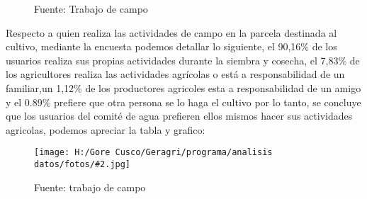 \documentclass{article}\usepackage[]{graphicx}\usepackage[table]{xcolor}
\makeatletter
\newenvironment{kframe}{%
 \def\at@end@of@kframe{}%
 \ifinner\ifhmode%
  \def\at@end@of@kframe{\end{minipage}}%
  \begin{minipage}{\columnwidth}%
 \fi\fi%
 \def\FrameCommand##1{\hskip\@totalleftmargin \hskip-\fboxsep
 \colorbox{shadecolor}{##1}\hskip-\fboxsep
     \hskip-\linewidth \hskip-\@totalleftmargin \hskip\columnwidth}%
 \MakeFramed {\advance\hsize-\width
   \@totalleftmargin\z@ \linewidth\hsize
   \@setminipage}}%
 {\par\unskip\endMakeFramed%
 \at@end@of@kframe}
\newenvironment{knitrout}{}{} %
\newenvironment{fotos}[2]
{\begin{figure}[H]
	\centering
	\caption{#1}
	\texttt{[image: H:/Gore Cusco/Geragri/programa/analisis datos/fotos/\#2.jpg]}
	\caption*{Fuente: trabajo de campo}}
{\end{figure}}
\makeatother
\begin{document}
\begin{figure}[H]
  \centering
  \caption{Persona que trabaja en la parcela}
\begin{knitrout}
\color{fgcolor}\begin{kframe}


{\ttfamily\noindent\bfseries{}}

{\ttfamily\noindent{}}

{\ttfamily\noindent\bfseries{}}

{\ttfamily\noindent\bfseries\color{errorcolor}{\#\# Error: objeto 'datos' no encontrado}}

{\ttfamily\noindent\bfseries\color{errorcolor}{\#\# Error: objeto 'datos' no encontrado}}

{\ttfamily\noindent\bfseries\color{errorcolor}{\#\# Error: objeto 'datos' no encontrado}}

{\ttfamily\noindent\bfseries\color{errorcolor}{\#\# Error: objeto 'graph1' no encontrado}}\end{kframe}
\end{knitrout}
  \caption*{Fuente: Trabajo de campo}
\end{figure}
Respecto a quien realiza las actividades de campo en la parcela destinada al cultivo, mediante la encuesta podemos detallar lo siguiente, el 90,16\% de los usuarios realiza sus propias actividades durante la siembra y cosecha, el 7,83\% de los agricultores realiza las actividades agrícolas o está a responsabilidad de un familiar,un 1,12\% de los productores agricoles esta a responsabilidad de un amigo y el 0.89\% prefiere que otra persona se lo haga el cultivo por lo tanto, se concluye que los usuarios del comité de agua prefieren ellos mismos hacer sus actividades agricolas, podemos apreciar la tabla y grafico:
\begin{fotos}
{sensibilizacion a la poblacion}{12}
\end{fotos}
\end{document}
